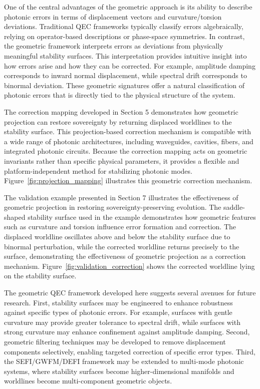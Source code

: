 \documentclass[aip,adv,reprint,floatfix]{revtex4-2}
\begin{document}
One of the central advantages of the geometric approach is its ability to describe photonic errors in terms
of displacement vectors and curvature/torsion deviations.\cite{DuttonElectronField2026}
Traditional QEC frameworks typically classify errors algebraically, relying on operator-based descriptions
or phase-space symmetries. In contrast, the geometric
framework interprets errors as deviations from physically
meaningful stability surfaces. This interpretation provides intuitive insight into how errors arise and how they
can be corrected. For example, amplitude damping corresponds to inward normal displacement, while spectral
drift corresponds to binormal deviation. These geometric
signatures offer a natural classification of photonic errors
that is directly tied to the physical structure of the system.

The correction mapping developed in Section 5 demonstrates how geometric projection can restore sovereignty
by returning displaced worldlines to the stability surface.\cite{DuttonSEFI2026}
This projection-based correction mechanism is compatible with a wide range of photonic architectures, including waveguides, cavities, fibers, and integrated photonic
circuits. Because the correction mapping acts on geometric invariants rather than specific physical parameters, it
provides a flexible and platform-independent method for
stabilizing photonic modes. Figure~\ref{fig:projection_mapping}
illustrates this geometric correction mechanism.

The validation example presented in Section 7 illustrates the effectiveness of geometric projection in restoring sovereignty-preserving evolution.\cite{DuttonElectronField2026}
The saddle-shaped
stability surface used in the example demonstrates how
geometric features such as curvature and torsion influence error formation and correction. The displaced worldline oscillates above and below the stability surface due
to binormal perturbation, while the corrected worldline
returns precisely to the surface, demonstrating the effectiveness of geometric projection as a correction mechanism. Figure~\ref{fig:validation_correction} shows the corrected worldline
lying on the stability surface.

The geometric QEC framework developed here suggests several avenues for future research. First, stability
surfaces may be engineered to enhance robustness against
specific types of photonic errors. For example, surfaces
with gentle curvature may provide greater tolerance to
spectral drift, while surfaces with strong curvature may
enhance confinement against amplitude damping. Second, geometric filtering techniques may be developed to
remove displacement components selectively, enabling
targeted correction of specific error types. Third, the
SEFI/GWFM/DEFI framework may be extended to
multi-mode photonic systems, where stability surfaces
become higher-dimensional manifolds and worldlines
become multi-component geometric objects.
\end{document}
